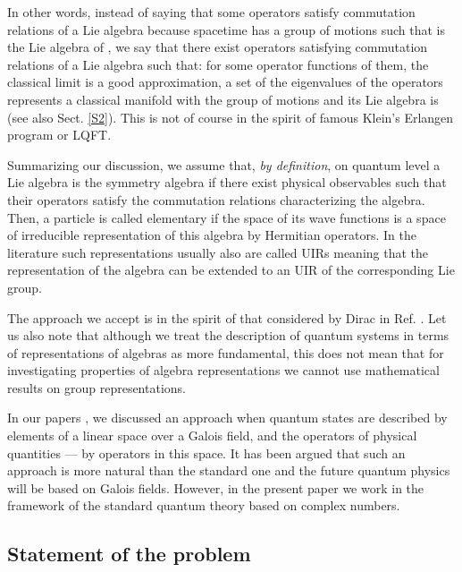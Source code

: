 \documentclass[a4paper,12pt]{article}%
\begin{document}
In other words, instead of saying that some operators 
satisfy commutation relations of a Lie algebra 
\coordHE{} because spacetime \coordHE{} has a group of motions \coordHE{} such 
that \coordHE{} is the Lie algebra of \coordHE{}, we say that there
exist operators satisfying  commutation 
relations of a Lie algebra \coordHE{} such that: for some 
operator functions \coordHE{} of them, the classical 
limit is a good approximation, a set \coordHE{} of the eigenvalues
of the operators \coordHE{} represents a classical manifold with 
the group of motions \coordHE{} and its Lie algebra is \coordHE{} (see also Sect. 
\ref{S2}). This is not of course in the spirit of 
famous Klein's Erlangen program \cite{Klein} or LQFT.

Summarizing our discussion, we assume that, 
{\it by definition}, on quantum level a Lie algebra is 
the symmetry algebra if there exist physical
observables such that their operators  
satisfy the commutation relations characterizing the
algebra. Then, a particle is called elementary if the 
space of its wave functions is a space of irreducible 
representation of this algebra by Hermitian operators. 
In the literature such representations usually also are 
called UIRs meaning that the representation of the 
algebra can be extended to an UIR of the corresponding 
Lie group. 
 
The approach we accept is in the spirit of that considered 
by Dirac in Ref. \cite{Dir}. Let us also note that 
although we treat the description of quantum systems in 
terms of representations of algebras as more 
fundamental, this does not mean that for investigating 
properties of algebra representations we cannot use
mathematical results on group representations. 

In our papers \cite{lev2}, we discussed an approach when 
quantum  states are described by elements of a linear 
space over a Galois field, and the operators of 
physical quantities --- by operators in this space. 
It has been argued that such an approach is more 
natural than the standard one and the future quantum
physics will be based on Galois fields. However, in 
the present paper we work in the framework of the 
standard quantum theory based on complex numbers.

\subsection{Statement of the problem}
\end{document}
